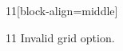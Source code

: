 \documentclass[paper=A4]{ropas-poster}
\begin{document}
\begin{postergrid}{1}{1}[block-align=middle]
\begin{posterblock}{1}{1}
Invalid grid option.
\end{posterblock}
\end{postergrid}
\end{document}
